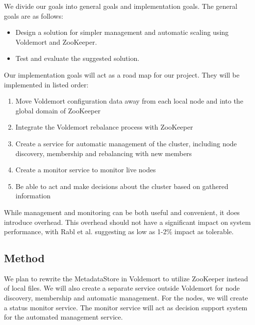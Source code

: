 We divide our goals into general goals and implementation goals. The general goals are as follows: 

\begin{itemize}
	\item{Design a solution for simpler management and automatic scaling using Voldemort and ZooKeeper.}
	\item{Test and evaluate the suggested solution.}
\end{itemize}

Our implementation goals will act as a road map for our project. They will be implemented in listed order:

\begin{enumerate}
	\item{Move Voldemort configuration data away from each local node and into the global domain of ZooKeeper}
	\item{Integrate the Voldemort rebalance process with ZooKeeper}
	\item{Create a service for automatic management of the cluster, including node discovery, membership and rebalancing with new members}
	\item{Create a monitor service to monitor live nodes}
	\item{Be able to act and make decisions about the cluster based on gathered information}
\end{enumerate}

While management and monitoring can be both useful and convenient, it does introduce overhead. This overhead should not have a significant impact on system performance, with Rabl et al. suggesting as low as 1-2\% impact as tolerable\cite{Rabl:2012:SBD:2367502.2367512}.

\subsection{Method}
We plan to rewrite the MetadataStore in Voldemort to utilize ZooKeeper instead of local files. We will also create a separate service outside Voldemort for node discovery, membership and automatic management. For the nodes, we will create a status monitor service. The monitor service will act as decision support system for the automated management service. 

